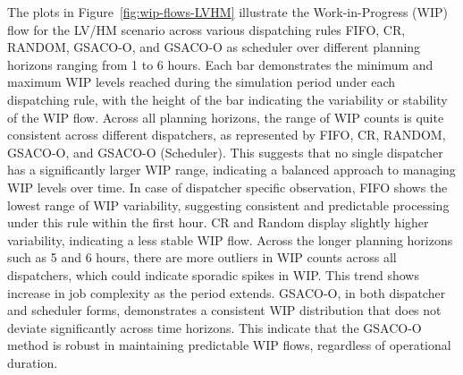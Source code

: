 The plots in Figure~\ref{fig:wip-flows-LVHM} illustrate the Work-in-Progress (WIP) flow for the LV/HM scenario across various dispatching rules FIFO, CR, RANDOM, GSACO-O, and GSACO-O as scheduler over different planning horizons ranging from 1 to 6 hours. Each bar demonstrates the minimum and maximum WIP levels reached during the simulation period under each dispatching rule, with the height of the bar indicating the variability or stability of the WIP flow. 
Across all planning horizons, the range of WIP counts is quite consistent across different dispatchers, as represented by FIFO, CR, RANDOM, GSACO-O, and GSACO-O (Scheduler). This suggests that no single dispatcher has a significantly larger WIP range, indicating a balanced approach to managing WIP levels over time.
In case of dispatcher specific observation, FIFO shows the lowest range of WIP variability, suggesting consistent and predictable processing under this rule within the first hour. CR and Random display slightly higher variability, indicating a less stable WIP flow.
Across the longer planning horizons such as 5 and 6 hours, there are more outliers in WIP counts across all dispatchers, which could indicate sporadic spikes in WIP. This trend shows increase in job complexity as the period extends. 
GSACO-O, in both dispatcher and scheduler forms, demonstrates a consistent WIP distribution that does not deviate significantly across time horizons. This indicate that the GSACO-O method is robust in maintaining predictable WIP flows, regardless of operational duration.



